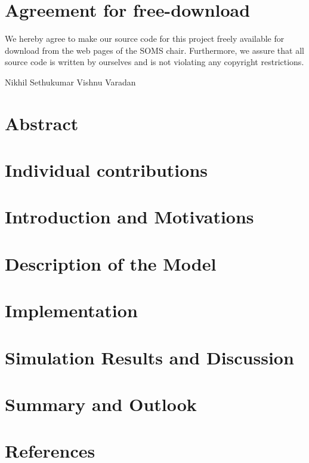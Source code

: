\documentclass[11pt, letterpaper]{article}
\title{\projtitle}
\author{\nameA, \nameB}
\newcommand{\nameA}{Nikhil Sethukumar}
\newcommand{\nameB}{Vishnu Varadan}
\begin{document}
    

    \section*{Agreement for free-download}
    
    \large We hereby agree to make our source code for this project freely available for download from the web pages of the SOMS chair. Furthermore, we assure that all source code is written by ourselves and is not violating any copyright restrictions.

    \vfill

     \nameA {} \nameB {}


   

    
\tableofcontents

\newpage


\section{Abstract}

\section{Individual contributions}

\section{Introduction and Motivations}

\section{Description of the Model}

\section{Implementation}

\section{Simulation Results and Discussion}

\section{Summary and Outlook}

\section{References}
\end{document}
